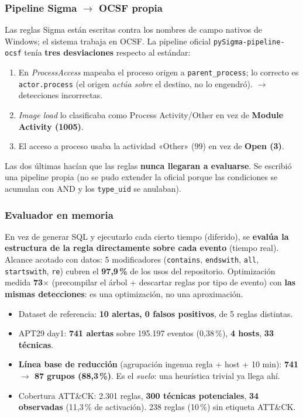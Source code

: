 \documentclass[11pt,a4paper]{article}
\newcommand{\cod}[1]{\texttt{#1}}
\newcommand{\flecha}{$\rightarrow$}
\begin{document}
\subsubsection*{Pipeline Sigma \flecha{} OCSF propia}
Las reglas Sigma están escritas contra los nombres de campo nativos de Windows; el sistema trabaja en OCSF.
La pipeline oficial \cod{pySigma-pipeline-ocsf} tenía \textbf{tres desviaciones} respecto al estándar:
\begin{enumerate}
  \item En \textit{ProcessAccess} mapeaba el proceso origen a \cod{parent\_process}; lo correcto es
        \cod{actor.process} (el origen \textit{actúa sobre} el destino, no lo engendró). \flecha{} detecciones incorrectas.
  \item \textit{Image load} lo clasificaba como Process Activity/Other en vez de \textbf{Module Activity (1005)}.
  \item El acceso a proceso usaba la actividad «Other» (99) en vez de \textbf{Open (3)}.
\end{enumerate}
Las dos últimas hacían que las reglas \textbf{nunca llegaran a evaluarse}. Se escribió una pipeline propia
(no se pudo extender la oficial porque las condiciones se acumulan con AND y los \cod{type\_uid} se anulaban).

\subsubsection*{Evaluador en memoria}
En vez de generar SQL y ejecutarlo cada cierto tiempo (diferido), se \textbf{evalúa la estructura de la regla
directamente sobre cada evento} (tiempo real). Alcance acotado con datos: 5 modificadores
(\cod{contains}, \cod{endswith}, \cod{all}, \cod{startswith}, \cod{re}) cubren el \textbf{97,9\,\%} de los usos del
repositorio. Optimización medida \textbf{73$\times$} (precompilar el árbol + descartar reglas por tipo de
evento) con \textbf{las mismas detecciones}: es una optimización, no una aproximación.

\begin{dato}[Resultados de F2]
\begin{itemize}
  \item Dataset de referencia: \textbf{10 alertas, 0 falsos positivos}, de 5 reglas distintas.
  \item APT29 day1: \textbf{741 alertas} sobre 195.197 eventos (0,38\,\%), \textbf{4 hosts}, \textbf{33 técnicas}.
  \item \textbf{Línea base de reducción} (agrupación ingenua regla + host + 10 min): \textbf{741 \flecha{} 87 grupos (88,3\,\%)}.
        Es el \textit{suelo}: una heurística trivial ya llega ahí.
  \item Cobertura ATT\&CK: 2.301 reglas, \textbf{300 técnicas potenciales}, \textbf{34 observadas} (11,3\,\% de activación).
        238 reglas (10\,\%) sin etiqueta ATT\&CK.
\end{itemize}
\end{dato}
\end{document}

